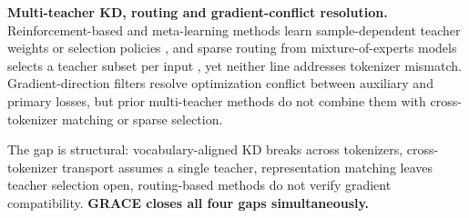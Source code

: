 \textbf{Multi-teacher KD, routing and gradient-conflict resolution.}
Reinforcement-based and meta-learning methods learn sample-dependent teacher
weights or selection policies
\cite{yuan2020reinforcedmultiteacherselection,zhang2023adaptivemultiteachermetalearning,yu2024selectdistill},
and sparse routing from mixture-of-experts models selects a teacher subset
per input
\cite{shazeer2017outrageouslylargeneuralnetworks,fedus2022switchtransformersscalingtrillion},
yet neither line addresses tokenizer mismatch. Gradient-direction filters
\cite{zhu2021studentcustomized,yu2020gradient} resolve optimization conflict
between auxiliary and primary losses, but prior multi-teacher methods do not
combine them with cross-tokenizer matching or sparse selection.

The gap is structural: vocabulary-aligned KD breaks across tokenizers,
cross-tokenizer transport assumes a single teacher, representation matching
leaves teacher selection open, routing-based methods do not verify gradient
compatibility. \textbf{GRACE closes all four gaps simultaneously.}
